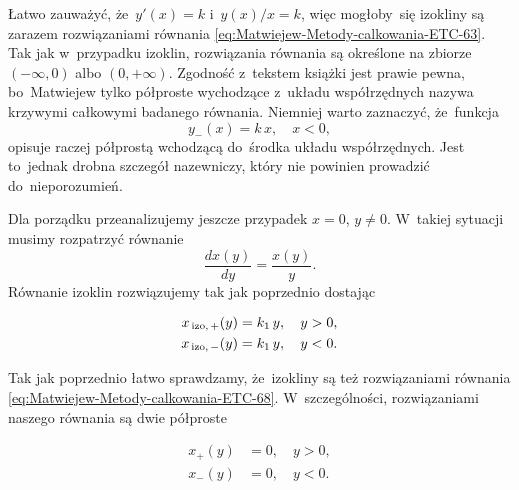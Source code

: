\documentclass[a4paper,11pt]{article}
\numberwithin{equation}{section}
\begin{document}
Łatwo zauważyć, że~$y'( x ) = k$ i~$y( x ) / x = k$, więc mogłoby~się
izokliny są zarazem rozwiązaniami równania
\eqref{eq:Matwiejew-Metody-calkowania-ETC-63}. Tak jak w~przypadku izoklin,
rozwiązania równania są określone na zbiorze $( -\infty, 0 )$
albo $( 0, +\infty )$. Zgodność z~tekstem książki jest prawie pewna,
bo~Matwiejew tylko półproste wychodzące z~układu współrzędnych nazywa
krzywymi całkowymi badanego równania. Niemniej warto zaznaczyć, że~funkcja
\begin{equation}
  \label{eq:Matwiejew-Metody-calkowania-ETC-67}
  y_{ - }( x ) = k \, x, \quad
  x < 0,
\end{equation}
opisuje raczej półprostą wchodzącą do~środka układu współrzędnych. Jest
to~jednak drobna szczegół nazewniczy, który nie powinien prowadzić
do~nieporozumień.

Dla porządku przeanalizujemy jeszcze przypadek $x = 0$, $y \neq 0$. W~takiej
sytuacji musimy rozpatrzyć równanie
\begin{equation}
  \label{eq:Matwiejew-Metody-calkowania-ETC-68}
  \frac{ d x( y ) }{ d y } = \frac{ x( y ) }{ y }.
\end{equation}
Równanie izoklin rozwiązujemy tak jak poprzednio dostając

\negVerSpaceFour


\begin{subequations}

  \begin{align}
    \label{eq:Matwiejew-Metody-calkowania-ETC-69-A}
    x_{ \, \textrm{izo}, \, + }( y )
    &= k_{ 1 } \, y, \quad
      y > 0, \\
    \label{eq:Matwiejew-Metody-calkowania-ETC-69-B}
    x_{ \, \textrm{izo}, \, - }( y )
    &= k_{ 1 } \, y, \quad
      y < 0.
  \end{align}

\end{subequations}


\noindent
Tak jak poprzednio łatwo sprawdzamy, że~izokliny są też rozwiązaniami
równania \eqref{eq:Matwiejew-Metody-calkowania-ETC-68}. W~szczególności,
rozwiązaniami naszego równania są dwie półproste

\negVerSpaceFour


\begin{subequations}

  \begin{align}
    \label{eq:Matwiejew-Metody-calkowania-ETC-70-A}
    x_{ + }( y )
    &= 0, \quad
      y > 0, \\
    \label{eq:Matwiejew-Metody-calkowania-ETC-70-B}
    x_{ - }( y )
    &= 0, \quad
      y < 0.
  \end{align}

\end{subequations}
\end{document}
